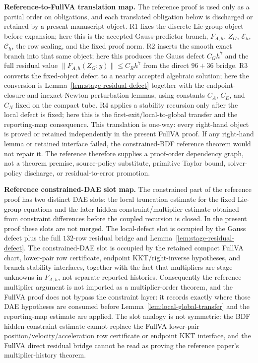 \documentclass[preprint,12pt]{elsarticle}
\begin{document}
\noindent\textbf{Reference-to-FullVA translation map.}
The reference proof is used only as a partial order on obligations, and
each translated obligation below is discharged or retained by a present
manuscript object.  R1 fixes the discrete Lie-group object before expansion;
here this is the accepted Gauss-predictor branch, \(F_{A,h}\), \(Z_G\),
\(\mathcal E_h\), \(\mathcal C_h\), the row scaling, and the fixed proof norm.
R2 inserts the smooth exact branch into that same object; here this produces
the Gauss defect \(C_Gh^7\) and the full residual value
\(\|F_{A,h}(Z_G;y)\|\le C_Rh^7\) from the direct \(96+36\) bridge.
R3 converts the fixed-object defect to a nearby accepted algebraic solution;
here the conversion is Lemma~\ref{lem:stage-residual-defect} together with
the endpoint-closure and inexact-Newton perturbation lemmas, using constants
\(C_A\), \(C_E\), and \(C_N\) fixed on the compact tube.  R4 applies a
stability recursion only after the local defect is fixed; here this is the
first-exit/local-to-global transfer and the reporting-map consequence.  This
translation is one-way: every right-hand object is proved or retained
independently in the present FullVA proof.  If any right-hand lemma or retained
interface failed, the constrained-BDF reference theorem would not repair it.
The reference therefore supplies a proof-order dependency graph, not a theorem
premise, source-policy substitute, primitive Taylor bound, solver-policy
discharge, or residual-to-error promotion.

\noindent\textbf{Reference constrained-DAE slot map.}
The constrained part of the reference proof has two distinct DAE slots: the
local truncation estimate for the fixed Lie-group equations and the later
hidden-constraint/multiplier estimate obtained from constraint differences
before the coupled recursion is closed.  In the present proof these slots are
not merged.  The local-defect slot is occupied by the Gauss defect plus the
full \(132\)-row residual bridge and
Lemma~\ref{lem:stage-residual-defect}.  The constrained-DAE slot is occupied
by the retained compact FullVA chart, lower-pair row certificate, endpoint
KKT/right-inverse hypotheses, and branch-stability interfaces, together with
the fact that multipliers are stage unknowns in \(F_{A,h}\), not separate
reported histories.  Consequently the reference multiplier argument is not
imported as a multiplier-order theorem, and the FullVA proof does not bypass
the constraint layer: it records exactly where those DAE hypotheses are
consumed before Lemma~\ref{lem:local-global-transfer} and the reporting-map
estimate are applied.  The slot analogy is not symmetric: the BDF
hidden-constraint estimate cannot replace the FullVA lower-pair
position/velocity/acceleration row certificate or endpoint KKT interface, and
the FullVA direct residual bridge cannot be read as proving the reference
paper's multiplier-history theorem.
\end{document}
